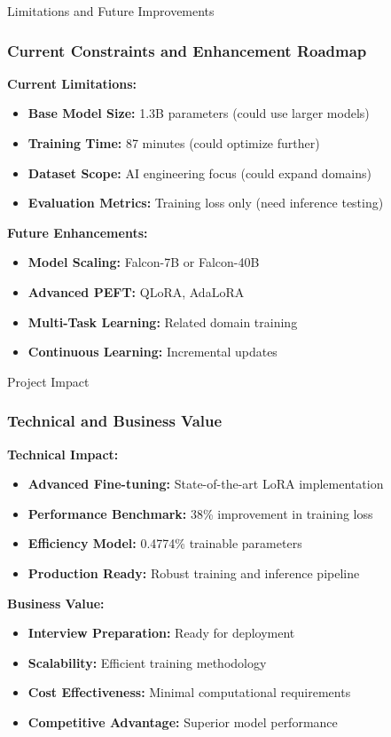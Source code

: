 \documentclass[aspectratio=169]{beamer}
\begin{document}
\begin{frame}{Limitations and Future Improvements}
\frametitle{Current Constraints and Enhancement Roadmap}

\textbf{Current Limitations:}
\begin{itemize}
    \item \textbf{Base Model Size:} 1.3B parameters (could use larger models)
    \item \textbf{Training Time:} 87 minutes (could optimize further)
    \item \textbf{Dataset Scope:} AI engineering focus (could expand domains)
    \item \textbf{Evaluation Metrics:} Training loss only (need inference testing)
\end{itemize}

\textbf{Future Enhancements:}
\begin{itemize}
    \item \textbf{Model Scaling:} Falcon-7B or Falcon-40B
    \item \textbf{Advanced PEFT:} QLoRA, AdaLoRA
    \item \textbf{Multi-Task Learning:} Related domain training
    \item \textbf{Continuous Learning:} Incremental updates
\end{itemize}
\end{frame}

\begin{frame}{Project Impact}
\frametitle{Technical and Business Value}

\textbf{Technical Impact:}
\begin{itemize}
    \item \textbf{Advanced Fine-tuning:} State-of-the-art LoRA implementation
    \item \textbf{Performance Benchmark:} 38\% improvement in training loss
    \item \textbf{Efficiency Model:} 0.4774\% trainable parameters
    \item \textbf{Production Ready:} Robust training and inference pipeline
\end{itemize}

\textbf{Business Value:}
\begin{itemize}
    \item \textbf{Interview Preparation:} Ready for deployment
    \item \textbf{Scalability:} Efficient training methodology
    \item \textbf{Cost Effectiveness:} Minimal computational requirements
    \item \textbf{Competitive Advantage:} Superior model performance
\end{itemize}
\end{frame}
\end{document}
